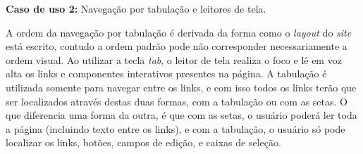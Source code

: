 {{{\textbf{Caso de uso 2:} Navegação por tabulação e leitores de tela.

A ordem da navegação por tabulação é derivada da forma como o \textit{layout} do \textit{site} está escrito, contudo a ordem padrão pode não corresponder necessariamente a ordem visual. Ao utilizar a tecla \textit{tab}, o leitor de tela realiza o foco e lê em voz alta os links e componentes interativos presentes na página.  A tabulação é utilizada somente para navegar entre os links, e com isso todos os links terão que ser localizados através destas duas formas, com a tabulação ou com as setas. O que diferencia uma forma da outra, é que com as setas, o usuário poderá ler toda a página (incluindo texto entre os links), e com a tabulação, o usuário só pode localizar os links, botões, campos de edição, e caixas de seleção.


}}}
